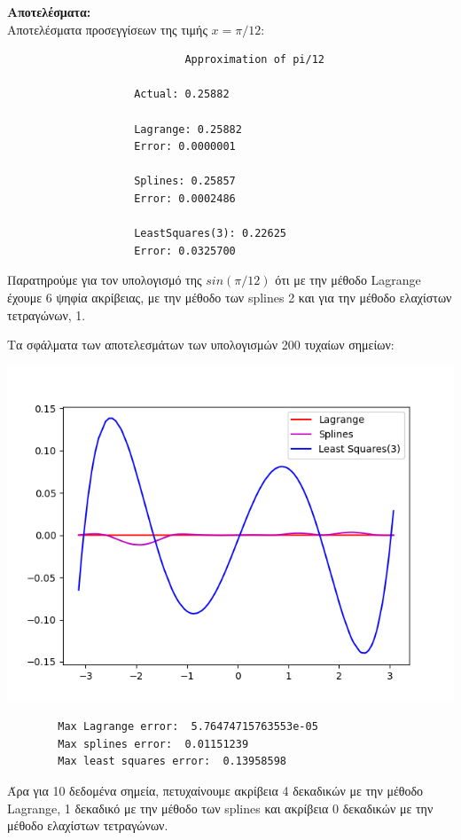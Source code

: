 \documentclass[a4paper,11pt]{article}
\newcommand{\lt}{\latintext}
\newcommand{\gt}{\greektext}
\begin{document}
{\begin{description}
\end{description}

\textbf{Αποτελέσματα:}\\
Αποτελέσματα προσεγγίσεων της τιμής $x=\pi/12$:
    \lt
    \begin{verbatim}
                            Approximation of pi/12

                    Actual: 0.25882

                    Lagrange: 0.25882
                    Error: 0.0000001

                    Splines: 0.25857
                    Error: 0.0002486

                    LeastSquares(3): 0.22625
                    Error: 0.0325700
    \end{verbatim}
    \gt
Παρατηρούμε για τον υπολογισμό της $sin(\pi/12)$ ότι με την μέθοδο {\lt Lagrange} έχουμε 6 ψηφία ακρίβειας, με την μέθοδο των {\lt splines} 2 και για την μέθοδο ελαχίστων τετραγώνων, 1.

Τα σφάλματα των αποτελεσμάτων των υπολογισμών 200 τυχαίων σημείων:
\begin{center}
    \includegraphics[scale=0.65]{sfalmata.png}
\end{center}
    \lt
    \begin{verbatim}
        Max Lagrange error:  5.76474715763553e-05
        Max splines error:  0.01151239
        Max least squares error:  0.13958598
    \end{verbatim}
    \gt
Άρα για 10 δεδομένα σημεία, πετυχαίνουμε ακρίβεια 4 δεκαδικών με την μέθοδο {\lt Lagrange}, 1 δεκαδικό με την μέθοδο των {\lt splines} και ακρίβεια 0 δεκαδικών με την μέθοδο ελαχίστων τετραγώνων.
\newpage
}
\end{document}
